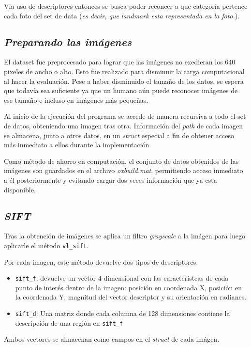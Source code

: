 Via uso de descriptores entonces se busca poder reconcer a que categoría pertence cada foto del set de data (\emph{es decir, que landmark esta representada en la foto.}).

\subsection{\emph{Preparando las imágenes}}
El dataset fue preprocesado para lograr que las imágenes no exedieran los $640$ pixeles de ancho o alto. Esto fue realizado para disminuir la carga computacional al hacer la evaluación.
Pese a haber disminuido el tamaño de los datos, se espera que todavía sea suficiente ya que un humano aún puede reconocer imágenes de ese tamaño e incluso en imágenes más pequeñas.

Al inicio de la ejecución del programa se accede de manera recursiva a todo el set de datos, obteniendo una imagen tras otra. Información del \emph{path} de cada imagen se almacena, junto a otros datos, en un \emph{struct} especial a fin de obtener acceso más inmediato a ellos durante la implementación.

Como método de ahorro en computación, el conjunto de datos obtenidos de las imágenes son guardados en el archivo \emph{oxbuild.mat}, permitiendo acceso inmediato a él posteriormente y evitando cargar dos veces información que ya esta disponible.




\subsection{\emph{SIFT}}
Tras la obtención de imágenes se aplica un filtro \emph{grayscale} a la imágen para luego aplicarle el método \texttt{vl\_sift}.

Por cada imagen, este método devuelve dos tipos de descriptores:
\begin{itemize}
  \item \texttt{sift\_f}: devuelve un vector 4-dimensional con las caracteristcas de cada punto de interés dentro de la imagen: posición en coordenada X, posición en la coordenada Y, magnitud del vector descriptor y su orientación en radianes.
  \item \texttt{sift\_d}: Una matriz donde cada columna de 128 dimensiones contiene la descripción de una región en \texttt{sift\_f}
\end{itemize}

Ambos vectores se almacenan como campos en el \emph{struct} de cada imágen.

